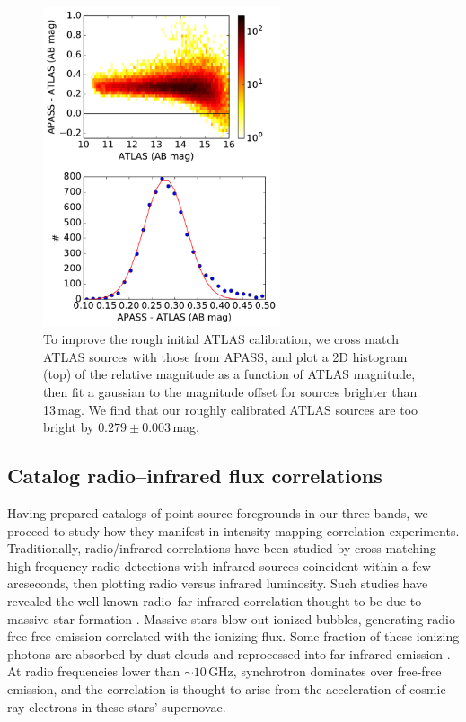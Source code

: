 \documentclass[numberedappendix]{emulateapj}
\providecommand{\DIFadd}[1]{{\protect\color{blue}\uwave{#1}}} %
\providecommand{\DIFdel}[1]{{\protect\color{red}\sout{#1}}}                      %
\providecommand{\DIFaddFL}[1]{\DIFadd{#1}} %
\providecommand{\DIFdelFL}[1]{\DIFdel{#1}} %
\providecommand{\DIFaddbeginFL}{} %
\providecommand{\DIFaddendFL}{} %
\providecommand{\DIFdelbeginFL}{} %
\providecommand{\DIFdelendFL}{} %
\begin{document}
\begin{figure}[t]
\centering
\includegraphics[width=2.75in]{ATLAS_vs_APASS_cal.pdf}
\caption[To improve the rough initial ATLAS calibration, we cross match ATLAS sources with those from APASS.]{To improve the rough initial ATLAS calibration, we cross match ATLAS sources with those from APASS, and plot a 2D histogram (top) of the relative magnitude as a function of ATLAS magnitude, then fit a \DIFdelbeginFL \DIFdelFL{gaussian }\DIFdelendFL \DIFaddbeginFL \DIFaddFL{Gaussian }\DIFaddendFL to the magnitude offset for sources brighter than 13\,mag. We find that our roughly calibrated ATLAS sources are too bright by $0.279\pm0.003$\,mag.}
\label{fig:ATLASvsAPASS}
\end{figure}


\subsection{Catalog radio--infrared flux correlations}
\label{sec:catcorrelations}

Having prepared catalogs of point source foregrounds in our three bands, we proceed to study how they manifest in intensity mapping correlation experiments. Traditionally, radio/infrared correlations have been studied by cross matching high frequency radio detections with infrared sources coincident within a few arcseconds, then plotting radio versus infrared luminosity. Such studies have revealed the well known radio--far infrared correlation thought to be due to massive star formation \citep[e.g.][]{helou85,dejong85,yun01,xu94,mauch07,Willott03}. Massive stars blow out ionized bubbles, generating radio free-free emission correlated with the ionizing flux. Some fraction of these ionizing photons are absorbed by dust clouds and reprocessed into far-infrared emission \citep{xu94}. At radio frequencies lower than $\sim10$\,GHz, synchrotron dominates over free-free emission, and the correlation is thought to arise from the acceleration of cosmic ray electrons in these stars' supernovae. 
\end{document}
